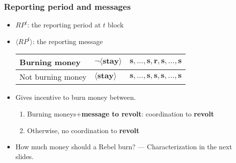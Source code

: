 \documentclass[9pt]{beamer}
\begin{document}
\begin{frame}
\frametitle{Reporting period and messages}


\pause
\begin{itemize}
\item $RP^t$: the reporting period at $t$ block

\item $\langle RP^t \rangle$: the reporting message
\begin{table}[h]
\begin{tabular}{l l l}
\alert{Burning money} & $\neg\langle \textbf{stay} \rangle$ & $\textbf{s},...,\textbf{s},{\textbf{r},\textbf{s},...,\textbf{s}}$ \\
\hline
\alert{Not burning money} & $\langle \textbf{stay} \rangle$ & $\textbf{s},...,\textbf{s},\textbf{s},\textbf{s},...,\textbf{s}$  \\

\end{tabular}
\end{table}

\pause
\item Gives incentive to burn money between.
\begin{enumerate}
\item {Burning moneys}+\textbf{message to revolt}: coordination to \textbf{revolt}

\item Otherwise, no coordination to \textbf{revolt}


\end{enumerate}

\pause

\item How much money should a Rebel burn? --- Characterization in the next slides.

\end{itemize}








\end{frame}
\end{document}
